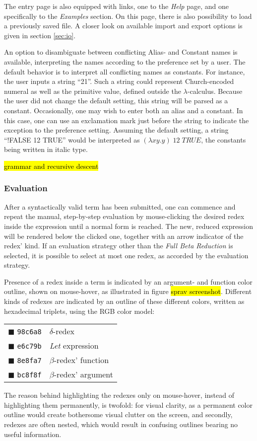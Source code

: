\documentclass[a4paper,10pt]{article}
\begin{document}
The entry page is also equipped with links, one to the \textit{Help} page, and one specifically
to the \textit{Examples} section. On this page, there is
also possibility to load a previously saved file. A closer look on
available import and export options is given in section \ref{sec:io}.

An option to disambiguate between conflicting Alias- and Constant names is available,
interpreting the names according to the preference set by a user. The default behavior is
to interpret all conflicting names as constants. For instance, the user inputs
a string ``21''. Such a string could represent Church-encoded numeral as well as the primitive
value, defined outside the $\lambda$-calculus. Because the user did not change the default
setting, this string will be parsed as a constant. Occasionally, one may wish
to enter both an alias and a constant. In this case, one can use an exclamation mark
just before the string to indicate the exception to the preference setting.
Assuming the default setting, a string ``!FALSE 12 TRUE'' would be interpreted as
$(\lambda xy.y)\;\textit{12}\;\textit{TRUE}$, the constants being written in italic type.

\hl{grammar and recursive descent}

\subsubsection{Evaluation}
After a syntactically valid term has been submitted, one can commence and repeat
the manual, step-by-step evaluation by
mouse-clicking the desired redex inside the expression until a normal form is reached.
The new, reduced expression will be rendered below the clicked one, together
with an arrow indicator of the redex' kind.
If an evaluation strategy other than the \textit{Full Beta Reduction} is selected, 
it is possible to select at most one redex, as accorded by the evaluation strategy.

Presence of a redex inside a term is
indicated by an argument- and function color outline, shown on mouse-hover, as illustrated
in figure \hl{sprav screenshot}. Different kinds of redexes are indicated by an outline of these different colors,
written as hexadecimal triplets, using the RGB color model:
\begin{center}
\begin{tabular}{ll}
	{\color{delta}$\blacksquare$} \texttt{98c6a8}   &$\delta$-redex\\
	{\color{letexpr}$\blacksquare$} \texttt{e6c79b} &\textit{Let} expression\\
	{\color{betaFunc}$\blacksquare$} \texttt{8e8fa7}&$\beta$-redex' function\\
	{\color{betaArg}$\blacksquare$} \texttt{bc8f8f} &$\beta$-redex' argument
\end{tabular}
\end{center}
The reason behind highlighting the redexes only on mouse-hover, instead of highlighting
them permanently, is twofold: for visual clarity, as a permanent color outline would
create bothersome visual clutter on the screen, and secondly, redexes are
often nested, which would result in confusing outlines bearing no useful information.
\end{document}
